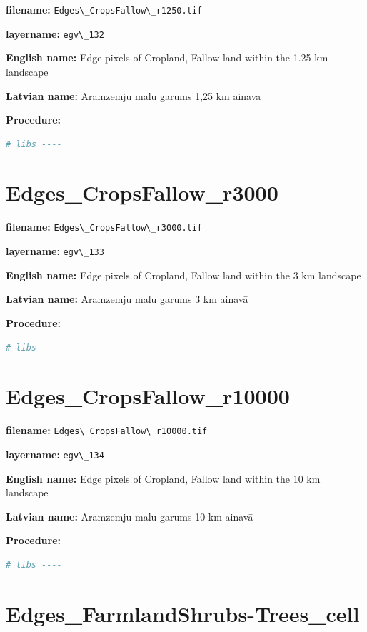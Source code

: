 \documentclass[
]{book}
\newcommand{\passthrough}[1]{#1}
\begin{document}
\textbf{filename:} \passthrough{\lstinline!Edges\_CropsFallow\_r1250.tif!}

\textbf{layername:} \passthrough{\lstinline!egv\_132!}

\textbf{English name:} Edge pixels of Cropland, Fallow land within the 1.25 km landscape

\textbf{Latvian name:} Aramzemju malu garums 1,25 km ainavā

\textbf{Procedure:}

\begin{lstlisting}[language=R]
# libs ----
\end{lstlisting}

\section{Edges\_CropsFallow\_r3000}\label{ch06.133}

\textbf{filename:} \passthrough{\lstinline!Edges\_CropsFallow\_r3000.tif!}

\textbf{layername:} \passthrough{\lstinline!egv\_133!}

\textbf{English name:} Edge pixels of Cropland, Fallow land within the 3 km landscape

\textbf{Latvian name:} Aramzemju malu garums 3 km ainavā

\textbf{Procedure:}

\begin{lstlisting}[language=R]
# libs ----
\end{lstlisting}

\section{Edges\_CropsFallow\_r10000}\label{ch06.134}

\textbf{filename:} \passthrough{\lstinline!Edges\_CropsFallow\_r10000.tif!}

\textbf{layername:} \passthrough{\lstinline!egv\_134!}

\textbf{English name:} Edge pixels of Cropland, Fallow land within the 10 km landscape

\textbf{Latvian name:} Aramzemju malu garums 10 km ainavā

\textbf{Procedure:}

\begin{lstlisting}[language=R]
# libs ----
\end{lstlisting}

\section{Edges\_FarmlandShrubs-Trees\_cell}\label{ch06.135}
\end{document}

